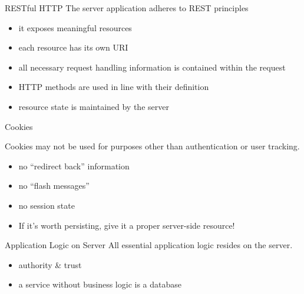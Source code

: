 \documentclass{beamer}
\begin{document}
\begin{frame}{RESTful HTTP}
  The server application adheres to REST principles

  \begin{itemize}
    \item it exposes meaningful resources
    \item each resource has its own URI
    \item all necessary request handling information is contained within the request
    \item HTTP methods are used in line with their definition
    \item resource state is maintained by the server
  \end{itemize}
\end{frame}

\begin{frame}{Cookies}

  Cookies may not be used for purposes other than authentication or user tracking.

  \begin{itemize}
    \item no ``redirect back'' information
    \item no ``flash messages''
    \item no session state
    \item If it's worth persisting, give it a proper server-side resource!
  \end{itemize}
\end{frame}

\begin{frame}{Application Logic on Server}
  All essential application logic resides on the server.

  \begin{itemize}
    \item authority \& trust
    \item a service without business logic is a database
  \end{itemize}

\end{frame}
\end{document}
